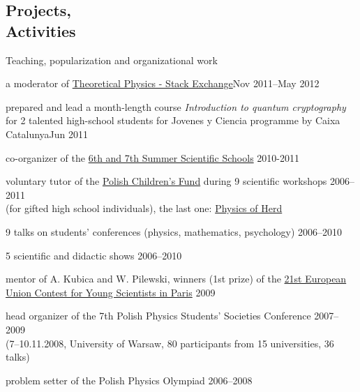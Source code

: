 \documentclass[margin,line]{resume}
\begin{document}
\begin{resume}
    \section{\mysidestyle Projects,\\Activities}
    Teaching, popularization and organizational work
        \begin{list2}
	    \item a moderator of \href{http://theoreticalphysics.stackexchange.com/}{Theoretical Physics - Stack Exchange}\hfill Nov 2011--May 2012
        \item prepared and lead a month-length course {\sl Introduction to quantum cryptography} for 2 talented high-school students for  Jovenes y Ciencia programme by Caixa Catalunya\hfill Jun 2011
        \item co-organizer of the \href{http://warsztatywww.wikidot.com/en}{6th and 7th  Summer Scientific Schools} \hfill 2010-2011%
        \item voluntary tutor of the \href{http://www.fundusz.org/?lang=gb}{Polish Children's Fund} during 9 scientific workshops \hfill 2006--2011\\
        (for gifted high school individuals), the last one: \href{http://migdal.wikidot.com/fizyka-stada}{Physics of Herd}
        \item 9 talks on students' conferences (physics, mathematics, psychology) \hfill 2006--2010
        \item 5 scientific and didactic shows \hfill 2006--2010
		\item mentor of A. Kubica and W. Pilewski, winners (1st prize) of the \href{http://www.eucys09.fr/}{21st European Union Contest for Young Scientists in Paris}  \hfill 2009
        \item head organizer of the 7th Polish Physics Students' Societies Conference \hfill 2007--2009\\
        (7--10.11.2008, University of Warsaw, 80 participants from 15 universities, 36 talks)
         \item problem setter of the Polish Physics Olympiad \hfill 2006--2008
        \end{list2} 
	

\end{resume}
\end{document}
